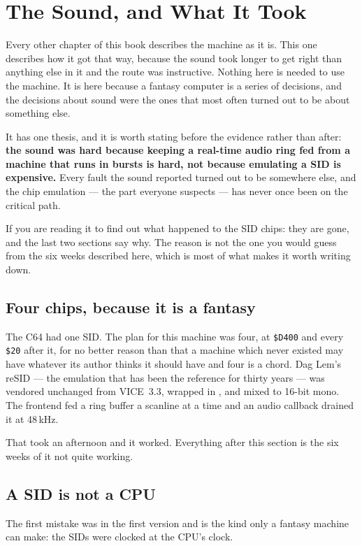 \chapter{The Sound, and What It Took}\label{cha:sound}

Every other chapter of this book describes the machine as it is. This
one describes how it got that way, because the sound took longer to get
right than anything else in it and the route was instructive. Nothing
here is needed to use the machine. It is here because a fantasy computer
is a series of decisions, and the decisions about sound were the ones
that most often turned out to be about something else.

It has one thesis, and it is worth stating before the evidence rather
than after: \textbf{the sound was hard because keeping a real-time audio
ring fed from a machine that runs in bursts is hard, not because
emulating a SID is expensive.} Every fault the sound reported turned out
to be somewhere else, and the chip emulation --- the part everyone
suspects --- has never once been on the critical path.

If you are reading it to find out what happened to the SID chips: they
are gone, and the last two sections say why. The reason is not the one
you would guess from the six weeks described here, which is most of what
makes it worth writing down.

\section{Four chips, because it is a fantasy}
The C64 had one SID. The plan for this machine was four, at
\texttt{\$D400} and every \texttt{\$20} after it, for no better reason
than that a machine which never existed may have whatever its author
thinks it should have and four is a chord. Dag Lem's reSID --- the
emulation that has been the reference for thirty years --- was vendored
unchanged from VICE~3.3, wrapped in , and mixed to
16-bit mono. The frontend fed a ring buffer a scanline at a time and an
audio callback drained it at 48\,kHz.

That took an afternoon and it worked. Everything after this section is
the six weeks of it not quite working.

\section{A SID is not a CPU}
The first mistake was in the first version and is the kind only a
fantasy machine can make: the SIDs were clocked at the CPU's clock.

